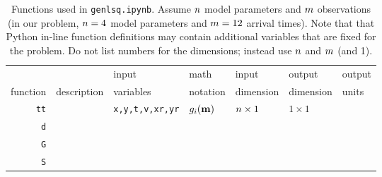 \begin{table}[h]
\caption[]{{
Functions used in {\tt genlsq.ipynb}.
Assume $n$ model parameters and $m$ observations (in our problem, $n=4$ model parameters and $m=12$ arrival times).
Note that that Python in-line function definitions may contain additional variables that are fixed for the problem.
Do not list numbers for the dimensions; instead use $n$ and $m$ (and 1).
\label{tab:funs}
}}
\begin{spacing}{4}
\hspace{-1.2cm}
\begin{tabular}{r|l|l|l|l|l|l}
\hline
         &                          & input      & math      & input     & output    & output \\
function & description \hspace{3cm} & variables  & notation  & dimension & dimension & units \hspace{0.5cm} \\
\hline\hline 
\verb+tt+ & & {\tt x,y,t,v,xr,yr} & $g_i(\mbox{${\bf m}$})$ & $n \times 1$ & $1 \times 1$ & \\ \hline
\verb+d+  & & & & & & \\ \hline
\verb+G+  & & & & & & \\ \hline
\verb+S+  & & & & & & \\ \hline
\end{tabular}
\end{spacing}
\end{table}

